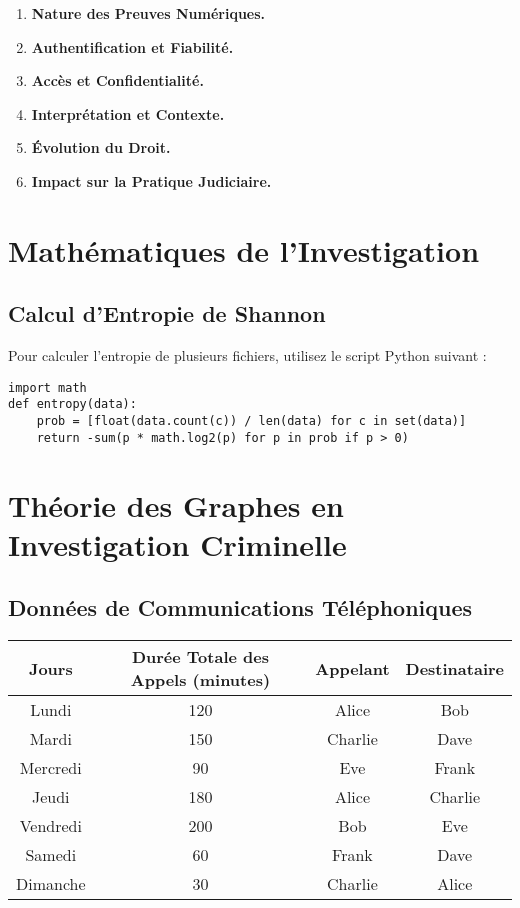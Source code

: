 \documentclass[12pt,a4paper]{article}
\begin{document}
\begin{enumerate}
    \item \textbf{Nature des Preuves Numériques.}
    \item \textbf{Authentification et Fiabilité.}
    \item \textbf{Accès et Confidentialité.}
    \item \textbf{Interprétation et Contexte.}
    \item \textbf{Évolution du Droit.}
    \item \textbf{Impact sur la Pratique Judiciaire.}
\end{enumerate}

\section{Mathématiques de l’Investigation}

\subsection{Calcul d’Entropie de Shannon}

Pour calculer l’entropie de plusieurs fichiers, utilisez le script Python suivant :

\begin{verbatim}
import math
def entropy(data):
    prob = [float(data.count(c)) / len(data) for c in set(data)]
    return -sum(p * math.log2(p) for p in prob if p > 0)
\end{verbatim}

\section{Théorie des Graphes en Investigation Criminelle}

\subsection*{Données de Communications Téléphoniques}

\begin{tabular}{|c|c|c|c|}
\hline
Jours & Durée Totale des Appels (minutes) & Appelant & Destinataire \\
\hline
Lundi & 120 & Alice & Bob \\
Mardi & 150 & Charlie & Dave \\
Mercredi & 90 & Eve & Frank \\
Jeudi & 180 & Alice & Charlie \\
Vendredi & 200 & Bob & Eve \\
Samedi & 60 & Frank & Dave \\
Dimanche & 30 & Charlie & Alice \\
\hline
\end{tabular}
\end{document}
